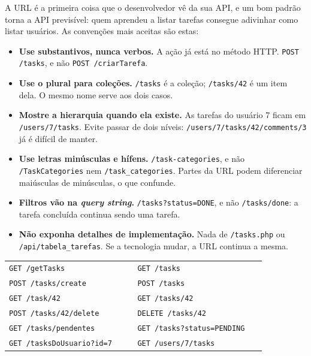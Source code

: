 A URL é a primeira coisa que o desenvolvedor vê da sua API, e um bom padrão torna a API previsível: quem aprendeu a listar tarefas consegue adivinhar como listar usuários. As convenções mais aceitas são estas:

\begin{itemize}
  \item \textbf{Use substantivos, nunca verbos.} A ação já está no método HTTP. \texttt{POST /tasks}, e não \texttt{POST /criarTarefa}.
  \item \textbf{Use o plural para coleções.} \texttt{/tasks} é a coleção; \texttt{/tasks/42} é um item dela. O mesmo nome serve aos dois casos.
  \item \textbf{Mostre a hierarquia quando ela existe.} As tarefas do usuário 7 ficam em \texttt{/users/7/tasks}. Evite passar de dois níveis: \texttt{/users/7/tasks/42/comments/3} já é difícil de manter.
  \item \textbf{Use letras minúsculas e hífens.} \texttt{/task-categories}, e não \texttt{/TaskCategories} nem \texttt{/task\_categories}. Partes da URL podem diferenciar maiúsculas de minúsculas, o que confunde.
  \item \textbf{Filtros vão na \textit{query string}.} \texttt{/tasks?status=DONE}, e não \texttt{/tasks/done}: a tarefa concluída continua sendo uma tarefa.
  \item \textbf{Não exponha detalhes de implementação.} Nada de \texttt{/tasks.php} ou \texttt{/api/tabela\_tarefas}. Se a tecnologia mudar, a URL continua a mesma.
\end{itemize}

\begin{center}
\begin{tabular}{@{}P{0.45\linewidth}P{0.45\linewidth}@{}}
\toprule
{}
 &  \\
\midrule
\texttt{GET /getTasks} & \texttt{GET /tasks} \\
 \texttt{POST /tasks/create} & \texttt{POST /tasks} \\
\texttt{GET /task/42} & \texttt{GET /tasks/42} \\
 \texttt{POST /tasks/42/delete} & \texttt{DELETE /tasks/42} \\
\texttt{GET /tasks/pendentes} & \texttt{GET /tasks?status=PENDING} \\
 \texttt{GET /tasksDoUsuario?id=7} & \texttt{GET /users/7/tasks} \\
\bottomrule
\end{tabular}
\end{center}

